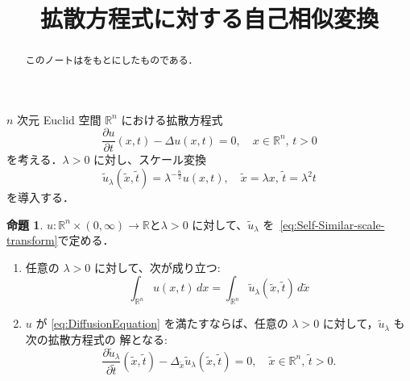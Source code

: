 \documentclass[paper=a4,
fontsize=12pt,
reqno,
uplatex,
dvipdfmx]{jlreq}
\title{拡散方程式に対する自己相似変換}
\author{}
\theoremstyle{definition} %
\newtheorem{proposition}[theorem]{命題}
\begin{document}
\maketitle

\begin{abstract}
 このノートは\cite{MR2656972}をもとにしたものである．
\end{abstract}


$n$ 次元 Euclid 空間 $\mathbb{R}^n$ における拡散方程式
\begin{equation}
 \label{eq:DiffusionEquation}
 \frac{\partial u}{\partial t}(x, t)
  -
  \Delta u(x, t) = 0, 
  \quad x \in \mathbb{R}^n,
  \, t > 0 \tag{D}
\end{equation}
を考える．$\lambda > 0$ に対し、スケール変換
\begin{equation}
 \label{eq:Self-Similar-scale-transform}
 \tilde{u}_{\lambda}(\tilde{x}, \tilde{t})
  =
  \lambda^{-\frac{n}{2}} u(x, t), 
  \quad 
  \tilde{x} = \lambda x, \, \tilde{t} = \lambda^2 t
\end{equation}
を導入する．

\begin{proposition}
 $u: \mathbb{R}^n \times (0, \infty) \rightarrow \mathbb{R}$と$\lambda >
 0$ に対して、$\tilde{u}_{\lambda}$
 を~\eqref{eq:Self-Similar-scale-transform}で定める．
 \begin{enumerate}
  \item 任意の $\lambda > 0$ に対して、次が成り立つ: 
   \begin{equation}
    \int_{\mathbb{R}^n} 
     u(x, t)
     \, dx 
     = 
     \int_{\mathbb{R}^n}
     \tilde{u}_{\lambda}(\tilde{x}, \tilde{t})
     \, 
     d\tilde{x}
   \end{equation}
  \item $u$ が \eqref{eq:DiffusionEquation} を満たすならば、任意の
	$\lambda > 0$ に対して，$\tilde{u}_{\lambda}$ も次の拡散方程式の
	解となる: 
	\begin{equation}
	 \frac{\partial \tilde{u}_{\lambda}}{\partial \tilde{t}}
	  (\tilde{x}, \tilde{t}) 
	  -
	  \Delta_{\tilde{x}} \tilde{u}_{\lambda}
	  (\tilde{x}, \tilde{t})
	  =
	  0,
	  \quad
	  \tilde{x} \in \mathbb{R}^n, \, 
	  \tilde{t} > 0.
	\end{equation}
 \end{enumerate}
\end{proposition}
\end{document}
